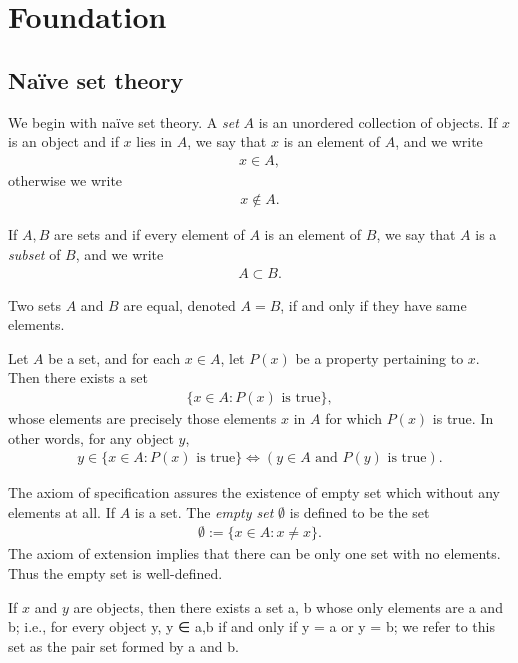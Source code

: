 
\chapter{Foundation}

\section{Na\"ive set theory}

We begin with na\"ive set theory. A \emph{set} $A$ is an unordered collection of objects. If $x$ is an object and if $x$ lies in $A$, we say that $x$ is an element of $A$, and we write
    \begin{align*}
        x \in A,
    \end{align*}
otherwise we write
    \begin{align*}
        x \notin A.
    \end{align*}

If $A, B$ are sets and if every element of $A$ is an element of $B$, we say that $A$ is a \emph{subset} of $B$, and we write
    \begin{align*}
        A \subset B.
    \end{align*}


\begin{axiom}
    Two sets $A$ and $B$ are equal, denoted $A = B$, if and only if they have same elements.
\end{axiom}

\begin{axiom}
    Let $A$ be a set, and for each $x \in A$, let $P(x)$ be a property pertaining to $x$. Then there exists a set 
    \begin{align*}
        \{x \in A : P(x) \text{ is true}\},
    \end{align*}
    whose elements are precisely those elements $x$ in $A$ for which $P(x)$ is true. In other words, for any object $y$,
        \begin{align*}
            y \in \{x \in A : P(x) \text{ is true}\}
            \Longleftrightarrow 
            (y \in A \text{ and } P(y) \text{ is true}).
        \end{align*}
\end{axiom}


The axiom of specification assures the existence of empty set which without any elements at all. If $A$ is a set. The \emph{empty set} $\emptyset$ is defined to be the set
        \begin{align*}
            \emptyset := \{x \in A : x \neq x\}.
        \end{align*}
The axiom of extension implies that there can be only one set with no elements. Thus the empty set is well-defined.


\begin{axiom}
    If $x$ and $y$ are objects, then there exists a set {a, b} whose only elements are a and b; i.e., for every object y, y ∈ {a,b} if and only if y = a or y = b; we refer to this set as the pair set formed by a and b.
\end{axiom}